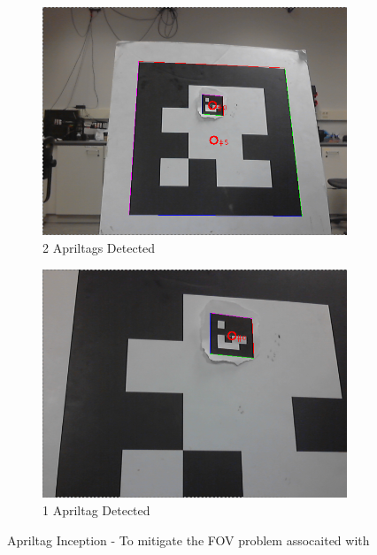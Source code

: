 \documentclass[11pt, twocolumn]{article}
\begin{document}
\begin{figure}[H]
	\centering
	\begin{subfigure}[b]{0.45\linewidth}
		\includegraphics[width=\textwidth]{images/apriltags_1.png}
		\caption{2 Apriltags Detected}
	\end{subfigure}
	\begin{subfigure}[b]{0.45\linewidth}
		\includegraphics[width=\textwidth]{images/apriltags_3.png}
		\caption{1 Apriltag Detected }
	\end{subfigure}
	\caption{Apriltag Inception - To mitigate the FOV problem assocaited with }
	\label{fig:apriltagInception}
\end{figure}
\end{document}
